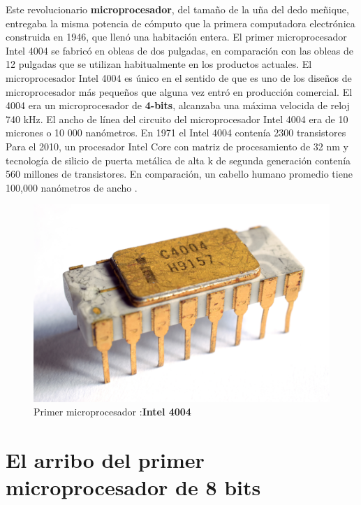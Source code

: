 Este revolucionario \textbf{microprocesador}, del tamaño de la uña del dedo meñique, entregaba la misma potencia de cómputo que la primera computadora electrónica construida 
en 1946, que llenó una habitación entera. El primer microprocesador Intel 4004 se fabricó en obleas de dos pulgadas, en comparación con las obleas de 12 
pulgadas que se utilizan habitualmente en los productos actuales. El microprocesador Intel 4004 es único en el sentido de que es uno de los diseños de 
microprocesador más pequeños que alguna vez entró en producción comercial. El 4004  era un microprocesador de \textbf{4-bits}, alcanzaba 
una máxima velocida de reloj 740 kHz. El ancho de línea del circuito del microprocesador Intel 4004 era de 10 micrones o 10 000 nanómetros. 
En 1971 el Intel 4004 contenía 2300 transistores Para el 2010, un procesador Intel Core con matriz de procesamiento de 32 nm y tecnología de silicio de puerta metálica de alta k de 
segunda generación contenía  560 millones de transistores. En comparación, un cabello humano promedio tiene 100,000 nanómetros de ancho .      

\begin{figure}[htb]
	\centering
	\includegraphics[scale = 0.15]{Graphics/Intel_C4004.jpg}
	\caption{Primer microprocesador :\textbf{Intel 4004}}
	\label{fig:12}
\end{figure}


\section{El arribo del primer microprocesador de 8 bits}

